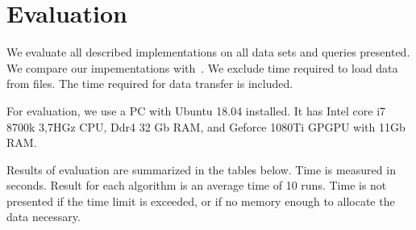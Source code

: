 \section{Evaluation}

We evaluate all described implementations on all data sets and queries presented.
We compare our impementations with~\cite{Azimov:2018:CPQ:3210259.3210264}.
We exclude time required to load data from files.
The time required for data transfer is included.

For evaluation, we use a PC with Ubuntu 18.04 installed.
It has Intel core i7 8700k 3,7HGz CPU, Ddr4 32 Gb RAM, and Geforce 1080Ti GPGPU with 11Gb RAM.

Results of evaluation are summarized in the tables below.
Time is measured in seconds.
Result for each algorithm is an average time of 10 runs.
Time is not presented if the time limit is exceeded, or if no memory enough to allocate the data necessary.

